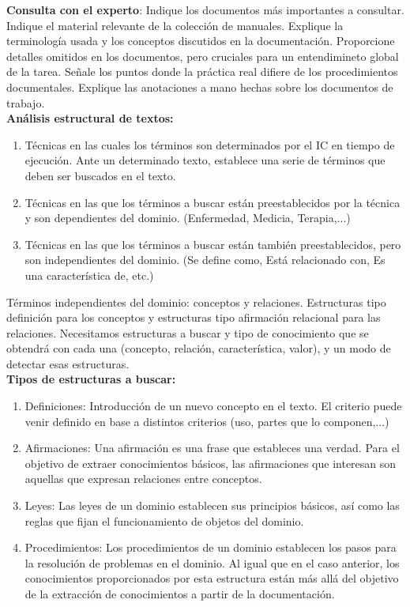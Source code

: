 \documentclass[12pt]{article}
\begin{document}
\textbf{Consulta con el experto}: Indique los documentos más importantes a consultar. Indique el material relevante de la colección de manuales. Explique la terminología usada y los conceptos discutidos en la documentación. Proporcione detalles omitidos en los documentos, pero cruciales para un entendimineto global de la tarea. Señale los puntos donde la práctica real difiere de los procedimientos documentales. Explique las anotaciones a mano hechas sobre los documentos de trabajo.\\

\textbf{Análisis estructural de textos:}
\begin{enumerate}
\item Técnicas en las cuales los términos son determinados por el IC en tiempo de ejecución. Ante un determinado texto, establece una serie de términos que deben ser buscados en el texto.
\item Técnicas en las que los términos a buscar están preestablecidos por la técnica y son dependientes del dominio. (Enfermedad, Medicia, Terapia,...)
\item Técnicas en las que los términos a buscar están también preestablecidos, pero son independientes del dominio. (Se define como, Está relacionado con, Es una característica de, etc.)
\end{enumerate}

Términos independientes del dominio: conceptos y relaciones. Estructuras tipo definición para los conceptos y estructuras tipo afirmación relacional para las relaciones. Necesitamos estructuras a buscar y tipo de conocimiento que se obtendrá con cada una (concepto, relación, característica, valor), y un modo de detectar esas estructuras.\\

\textbf{Tipos de estructuras a buscar:}
\begin{enumerate}
\item Definiciones: Introducción de un nuevo concepto en el texto. El criterio puede venir definido en base a distintos criterios (uso, partes que lo componen,...)
\item Afirmaciones: Una afirmación es una frase que estableces una verdad. Para el objetivo de extraer conocimientos básicos, las afirmaciones que interesan son aquellas que expresan relaciones entre conceptos.
\item Leyes: Las leyes de un dominio establecen sus principios básicos, así como las reglas que fijan el funcionamiento de objetos del dominio.
\item Procedimientos: Los procedimientos de un dominio establecen los pasos para la resolución de problemas en el dominio. Al igual que en el caso anterior, los conocimientos proporcionados por esta estructura están más allá del objetivo de la extracción de conocimientos a partir de la documentación.
\end{enumerate}
\end{document}
